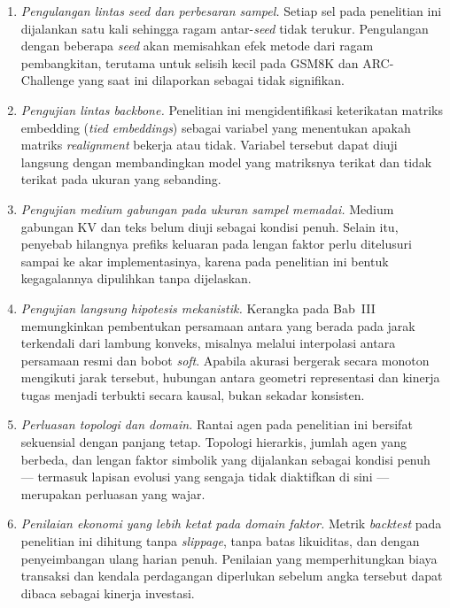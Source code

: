 \begin{enumerate}
    \item \textit{Pengulangan lintas seed dan perbesaran sampel.}
          Setiap sel pada penelitian ini dijalankan satu kali sehingga ragam
          antar-\textit{seed} tidak terukur. Pengulangan dengan beberapa
          \textit{seed} akan memisahkan efek metode dari ragam pembangkitan,
          terutama untuk selisih kecil pada GSM8K dan ARC-Challenge yang saat
          ini dilaporkan sebagai tidak signifikan.

    \item \textit{Pengujian lintas backbone.} Penelitian ini
          mengidentifikasi keterikatan matriks embedding (\textit{tied
          embeddings}) sebagai variabel yang menentukan apakah matriks
          \textit{realignment} bekerja atau tidak. Variabel tersebut dapat
          diuji langsung dengan membandingkan model yang matriksnya terikat dan
          tidak terikat pada ukuran yang sebanding.

    \item \textit{Pengujian medium gabungan pada ukuran sampel memadai.}
          Medium gabungan KV dan teks belum diuji sebagai kondisi penuh. Selain
          itu, penyebab hilangnya prefiks keluaran pada lengan faktor perlu
          ditelusuri sampai ke akar implementasinya, karena pada penelitian ini
          bentuk kegagalannya dipulihkan tanpa dijelaskan.

    \item \textit{Pengujian langsung hipotesis mekanistik.} Kerangka pada
          Bab~III memungkinkan pembentukan persamaan antara yang berada pada
          jarak terkendali dari lambung konveks, misalnya melalui interpolasi
          antara persamaan resmi dan bobot \textit{soft}. Apabila akurasi
          bergerak secara monoton mengikuti jarak tersebut, hubungan antara
          geometri representasi dan kinerja tugas menjadi terbukti secara
          kausal, bukan sekadar konsisten.

    \item \textit{Perluasan topologi dan domain.} Rantai agen pada penelitian
          ini bersifat sekuensial dengan panjang tetap. Topologi hierarkis,
          jumlah agen yang berbeda, dan lengan faktor simbolik yang dijalankan
          sebagai kondisi penuh --- termasuk lapisan evolusi yang sengaja tidak
          diaktifkan di sini --- merupakan perluasan yang wajar.

    \item \textit{Penilaian ekonomi yang lebih ketat pada domain faktor.}
          Metrik \textit{backtest} pada penelitian ini dihitung tanpa
          \textit{slippage}, tanpa batas likuiditas, dan dengan penyeimbangan
          ulang harian penuh. Penilaian yang memperhitungkan biaya transaksi
          dan kendala perdagangan diperlukan sebelum angka tersebut dapat
          dibaca sebagai kinerja investasi.
\end{enumerate}
